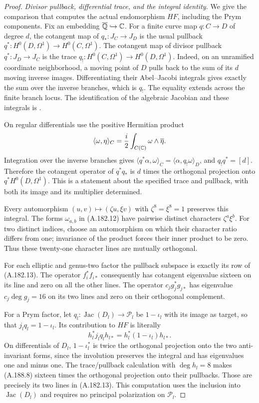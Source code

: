 \begin{proof}
\emph{Divisor pullback, differential trace, and the integral identity.}
We give the comparison that computes the actual endomorphism
\(HF\), including the Prym components.  Fix an embedding
\(\overline{\mathbb Q}\hookrightarrow\mathbb C\).  For a finite curve
map \(q:C\to D\) of degree \(d\), the cotangent map
of \(q_*:J_C\to J_D\) is the usual pullback
\(q^*:H^0(D,\Omega^1)\to H^0(C,\Omega^1)\).
The cotangent map of divisor pullback
\(q^*:J_D\to J_C\) is the trace
\(q_!:H^0(C,\Omega^1)\to H^0(D,\Omega^1)\).
Indeed, on an unramified coordinate neighborhood, a moving
point of \(D\) pulls back to the sum of its \(d\)
moving inverse images.  Differentiating their Abel--Jacobi
integrals gives exactly the sum over the inverse branches,
which is \(q_!\).  The equality extends across the
finite branch locus.  The identification of the algebraic
Jacobian and these integrals is
\cite[Theorem 2.5 and its proof, pp.7--8]{RootMilneJV2021}.

On regular differentials use the positive Hermitian product
\[
       \langle\omega,\eta\rangle_C
          =\frac{i}{2}\int_{C(\mathbb C)}\omega\wedge\overline\eta.
\]
Integration over the inverse branches gives
\(\langle q^*\alpha,\omega\rangle_C
 =\langle\alpha,q_!\omega\rangle_D\), and
\(q_!q^*=[d]\).  Therefore the cotangent operator of
\(q^*q_*\) is \(d\) times the orthogonal projection
onto \(q^*H^0(D,\Omega^1)\).  This is a statement
about the specified trace and pullback, with both its
image and its multiplier determined.

Every automorphism \((u,v)\mapsto(\zeta u,\xi v)\)
with \(\zeta^8=\xi^8=1\) preserves this integral.
The forms \(\omega_{a,b}\) in (A.182.12) have
pairwise distinct characters \(\zeta^a\xi^b\).
For two distinct indices, choose an automorphism on
which their character ratio differs from one; invariance
of the product forces their inner product to be zero.
Thus these twenty-one character lines are mutually
orthogonal.

For each elliptic and genus-two factor the pullback
subspace is exactly its row of (A.182.13).  The operator
\(f_i^*f_{i*}\) consequently has cotangent eigenvalue
sixteen on its line and zero on all the other lines.
The operator \(c_jg_j^*g_{j*}\) has eigenvalue
\(c_j\deg g_j=16\) on its two lines and zero on
their orthogonal complement.

For a Prym factor, let
\(q_l:\operatorname{Jac}(D_l)\to\mathcal P_l\)
be \(1-\iota_l\) with its image as target, so that
\(j_lq_l=1-\iota_l\).  Its contribution to \(HF\)
is literally
\[
             h_l^*j_lq_lh_{l*}
                  =h_l^*(1-\iota_l)h_{l*}.
\tag{A.188.8}
\]
On differentials of \(D_l\), \(1-\iota_l^*\)
is twice the orthogonal projection onto the two
anti-invariant forms, since the involution preserves
the integral and has eigenvalues one and minus one.
The trace/pullback calculation with \(\deg h_l=8\)
makes (A.188.8) sixteen times the orthogonal projection
onto their pullbacks.  Those are precisely its two
lines in (A.182.13).  This computation uses the
inclusion into \(\operatorname{Jac}(D_l)\) and
requires no principal polarization on \(\mathcal P_l\).


\end{proof}
